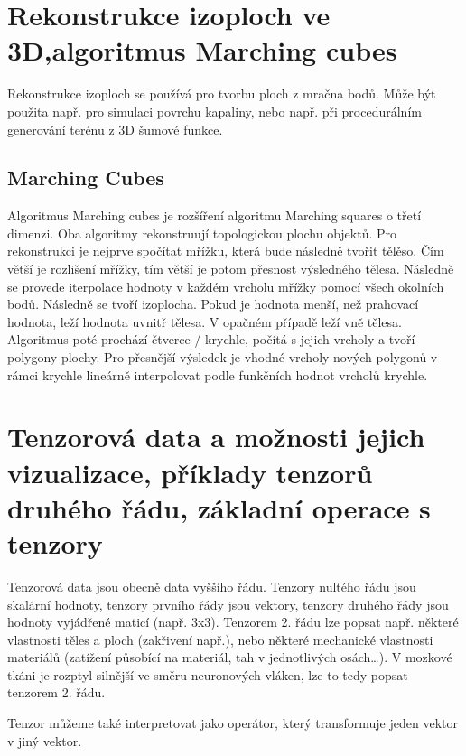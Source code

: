 \documentclass[10pt,a4paper, table]{article}
\begin{document}
\clearpage
\section{Rekonstrukce izoploch ve 3D,algoritmus Marching cubes}
Rekonstrukce izoploch se používá pro tvorbu ploch z mračna bodů. Může být použita např. pro simulaci povrchu kapaliny, nebo např. při procedurálním generování terénu z 3D šumové funkce.
\subsection{Marching Cubes}
Algoritmus Marching cubes je rozšíření algoritmu Marching squares o třetí dimenzi. Oba algoritmy rekonstruují topologickou plochu objektů. Pro rekonstrukci je nejprve spočítat mřížku, která bude následně tvořit tělěso. Čím větší je rozlišení mřížky, tím větší je potom přesnost výsledného tělesa. Následně se provede iterpolace hodnoty v každém vrcholu mřížky pomocí všech okolních bodů. Následně se tvoří izoplocha. Pokud je hodnota menší, než prahovací hodnota, leží hodnota uvnitř tělesa. V opačném případě leží vně tělesa. Algoritmus poté prochází čtverce / krychle, počítá s jejich vrcholy a tvoří polygony plochy. Pro přesnější výsledek je vhodné vrcholy nových polygonů v rámci krychle lineárně interpolovat podle funkčních hodnot vrcholů krychle.
\clearpage
\section{Tenzorová data a možnosti jejich vizualizace, příklady tenzorů druhého řádu, základní operace s tenzory}
Tenzorová data jsou obecně data vyššího řádu. Tenzory nultého řádu jsou skalární hodnoty, tenzory prvního řády jsou vektory, tenzory druhého řády jsou hodnoty vyjádřené maticí (např. 3x3). Tenzorem 2. řádu lze popsat např. některé vlastnosti těles a ploch (zakřivení např.), nebo některé mechanické vlastnosti materiálů (zatížení působící na materiál, tah v jednotlivých osách\dots). V mozkové tkáni je rozptyl silnější ve směru neuronových vláken, lze to tedy popsat tenzorem 2. řádu. \par
Tenzor můžeme také interpretovat jako operátor, který transformuje jeden vektor v jiný vektor.
\end{document}
